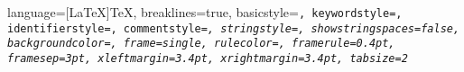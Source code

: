 \lstset
{	language=[LaTeX]TeX,
    breaklines=true,
    basicstyle=\tt\normalsize,
    keywordstyle=\color{blue},
    identifierstyle=\color{black},
    commentstyle=\color{limegreen}\itshape,
    stringstyle=\rmfamily,
    showstringspaces=false,
    backgroundcolor=\color{slight},
    frame=single,							%
    rulecolor=\color{gray(x11gray)},
    framerule=0.4pt,							%
    framesep=3pt,							%
    xleftmargin=3.4pt,		%
    xrightmargin=3.4pt,		%
    tabsize=2				%
}

